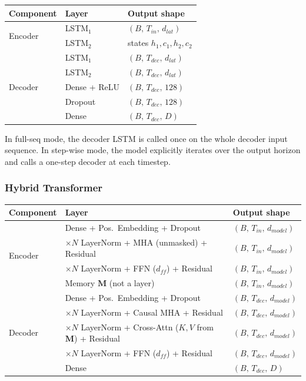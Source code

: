 \begin{table}[h]
\centering
\begin{tabular}{lll}
\hline
\textbf{Component} & \textbf{Layer} & \textbf{Output shape} \\
\hline
\multirow{2}{*}{Encoder}
  & LSTM$_1$                & $(B,\,T_{in},\,d_{lat})$ \\
  & LSTM$_2$                & states $h_1,c_1,h_2,c_2$ \\
\hline
\multirow{5}{*}{Decoder}
  & LSTM$_1$                & $(B,\,T_{dec},\,d_{lat})$ \\
  & LSTM$_2$                & $(B,\,T_{dec},\,d_{lat})$ \\
  & Dense + ReLU            & $(B,\,T_{dec},\,128)$ \\
  & Dropout                 & $(B,\,T_{dec},\,128)$ \\
  & Dense                   & $(B,\,T_{dec},\,D)$ \\
\hline
\end{tabular}
\end{table}

In full-seq mode, the decoder LSTM is called once on the whole decoder input sequence. In step-wise mode, the model explicitly iterates over the output horizon and calls a one-step decoder at each timestep.



\subsubsection{Hybrid Transformer}




\begin{table}[h]
\centering
\begin{tabular}{lll}
\hline
\textbf{Component} & \textbf{Layer} & \textbf{Output shape} \\
\hline
\multirow{4}{*}{Encoder}
  & Dense + Pos.\ Embedding + Dropout & $(B,\,T_{in},\,d_{model})$ \\
  & $\times N$\; LayerNorm + MHA (unmasked) + Residual & $(B,\,T_{in},\,d_{model})$ \\
  & $\times N$\; LayerNorm + FFN ($d_{ff}$) + Residual & $(B,\,T_{in},\,d_{model})$ \\
  & Memory $\mathbf{M}$ (not a layer)      & $(B,\,T_{in},\,d_{model})$ \\
\hline
\multirow{5}{*}{Decoder}
  & Dense + Pos.\ Embedding + Dropout & $(B,\,T_{dec},\,d_{model})$ \\
  & $\times N$\; LayerNorm + Causal MHA + Residual & $(B,\,T_{dec},\,d_{model})$ \\
  & $\times N$\; LayerNorm + Cross-Attn ($K,V$ from $\mathbf{M}$) + Residual & $(B,\,T_{dec},\,d_{model})$ \\
  & $\times N$\; LayerNorm + FFN ($d_{ff}$) + Residual & $(B,\,T_{dec},\,d_{model})$ \\
  & Dense                    & $(B,\,T_{dec},\,D)$ \\
\hline
\end{tabular}
\end{table}

